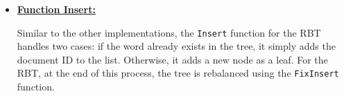 \begin{itemize}
\begin{itemize}
        \end{itemize}
        \item \underline{\textbf{Function Insert:}} 
        
        Similar to the other implementations, the \texttt{Insert} function for the RBT handles two cases: if the word already exists in the tree, it simply adds the document ID to the list. Otherwise, it adds a new node as a leaf. For the RBT, at the end of this process, the tree is rebalanced using the \texttt{FixInsert} function.
    \end{itemize}        





    
